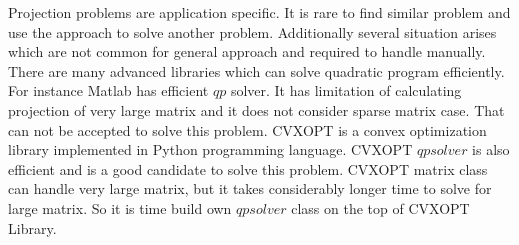   Projection problems are application specific. It is rare to find similar problem and use the approach to solve another problem. Additionally several situation arises which are not common for general approach and required to handle manually. There are many advanced libraries which can solve quadratic program efficiently. For instance Matlab has efficient $qp$ solver. It has limitation of calculating projection of very large matrix and it does not consider sparse matrix case. That can not be accepted to solve this problem. CVXOPT is a convex optimization library implemented in Python programming language. CVXOPT $qpsolver$ is also efficient and is a good candidate to solve this problem. CVXOPT matrix class can handle very large matrix, but it takes considerably longer time to solve for large matrix. So it is time build own $qpsolver$ class on the top of CVXOPT Library.\\


